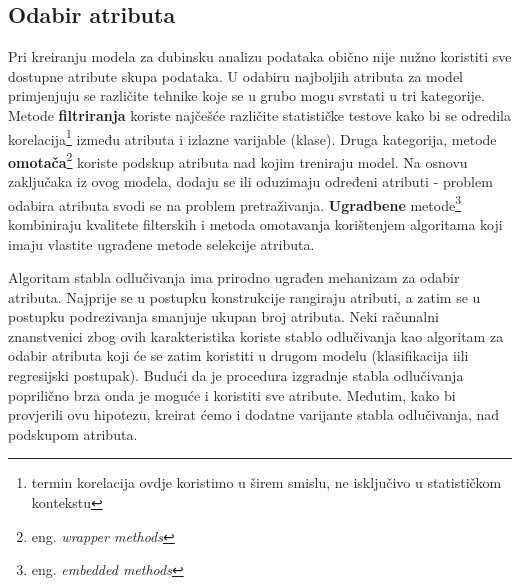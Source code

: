 \subsection{Odabir atributa}
Pri kreiranju modela za dubinsku analizu podataka obično nije nužno koristiti sve dostupne atribute skupa podataka. U odabiru najboljih atributa za model primjenjuju se različite tehnike koje se u grubo mogu svrstati u tri kategorije. Metode \textbf{filtriranja} koriste najčešće različite statističke testove kako bi se odredila korelacija\footnote{termin korelacija ovdje koristimo u širem smislu, ne isključivo u statističkom kontekstu} između atributa i izlazne varijable (klase). Druga kategorija, metode \textbf{omotača}\footnote{eng. \textit{wrapper methods}} koriste podskup atributa nad kojim treniraju model. Na osnovu zaključaka iz ovog modela, dodaju se ili oduzimaju određeni atributi - problem odabira atributa svodi se na problem pretraživanja. \textbf{Ugradbene} metode\footnote{eng. \textit{embedded methods}} kombiniraju kvalitete filterskih i metoda omotavanja korištenjem algoritama koji imaju vlastite ugrađene metode selekcije atributa.

Algoritam stabla odlučivanja ima prirodno ugrađen mehanizam za odabir atributa. Najprije se u postupku konstrukcije rangiraju atributi, a zatim se u postupku podrezivanja smanjuje ukupan broj atributa. Neki računalni znanstvenici\cite{Grabczewski01} zbog ovih karakteristika koriste stablo odlučivanja kao algoritam za odabir atributa koji će se zatim koristiti u drugom modelu (klasifikacija iili regresijski postupak). Budući da je procedura izgradnje stabla odlučivanja poprilično brza onda je moguće i koristiti sve atribute. Međutim, kako bi provjerili ovu hipotezu, kreirat ćemo i dodatne varijante stabla odlučivanja, nad podskupom atributa.

